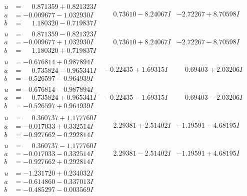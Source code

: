 \documentclass[1p]{elsarticle_modified}
\theoremstyle{definition}
\begin{document}
$$\begin{array}{c|c|c}
\begin{aligned}
u &= \phantom{-}0.871359 + 0.821323 I \\
a &= -0.009677 - 1.032930 I \\
b &= \phantom{-}1.180320 - 0.719837 I\end{aligned}
 & \phantom{-}0.73610 - 8.24067 I & -2.72267 + 8.70598 I \\ \hline\begin{aligned}
u &= \phantom{-}0.871359 - 0.821323 I \\
a &= -0.009677 + 1.032930 I \\
b &= \phantom{-}1.180320 + 0.719837 I\end{aligned}
 & \phantom{-}0.73610 + 8.24067 I & -2.72267 - 8.70598 I \\ \hline\begin{aligned}
u &= -0.676814 + 0.987894 I \\
a &= \phantom{-}0.735824 - 0.965341 I \\
b &= -0.526597 - 0.964939 I\end{aligned}
 & -0.22435 + 1.69315 I & \phantom{-}0.69403 + 2.03206 I \\ \hline\begin{aligned}
u &= -0.676814 - 0.987894 I \\
a &= \phantom{-}0.735824 + 0.965341 I \\
b &= -0.526597 + 0.964939 I\end{aligned}
 & -0.22435 - 1.69315 I & \phantom{-}0.69403 - 2.03206 I \\ \hline\begin{aligned}
u &= \phantom{-}0.360737 + 1.177760 I \\
a &= -0.017033 + 0.332514 I \\
b &= -0.927662 - 0.292814 I\end{aligned}
 & \phantom{-}2.29381 + 2.51402 I & -1.19591 - 4.68195 I \\ \hline\begin{aligned}
u &= \phantom{-}0.360737 - 1.177760 I \\
a &= -0.017033 - 0.332514 I \\
b &= -0.927662 + 0.292814 I\end{aligned}
 & \phantom{-}2.29381 - 2.51402 I & -1.19591 + 4.68195 I \\ \hline\begin{aligned}
u &= -1.231720 + 0.234032 I \\
a &= -0.614860 - 0.337013 I \\
b &= -0.485297 - 0.003569 I\end{aligned}

\end{array}$$
\end{document}
